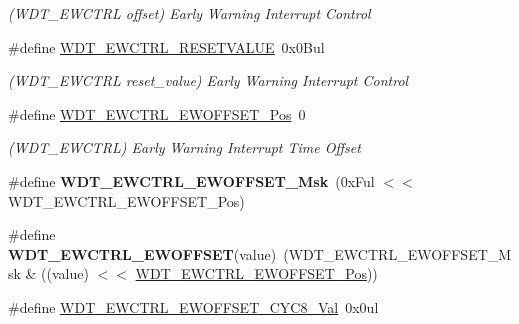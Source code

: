 \begin{DoxyCompactItemize}
\begin{DoxyCompactList}\small\item\em (W\+D\+T\+\_\+\+E\+W\+C\+T\+R\+L offset) Early Warning Interrupt Control \end{DoxyCompactList}\item 
\hypertarget{group___s_a_m_l21___w_d_t_ga9379b9c03732aac0dc5eacfe28fd35f8}{}\#define \hyperlink{group___s_a_m_l21___w_d_t_ga9379b9c03732aac0dc5eacfe28fd35f8}{W\+D\+T\+\_\+\+E\+W\+C\+T\+R\+L\+\_\+\+R\+E\+S\+E\+T\+V\+A\+L\+U\+E}~0x0\+Bul\label{group___s_a_m_l21___w_d_t_ga9379b9c03732aac0dc5eacfe28fd35f8}

\begin{DoxyCompactList}\small\item\em (W\+D\+T\+\_\+\+E\+W\+C\+T\+R\+L reset\+\_\+value) Early Warning Interrupt Control \end{DoxyCompactList}\item 
\hypertarget{group___s_a_m_l21___w_d_t_gabb7809711cdf296121c2108b55d3ad33}{}\#define \hyperlink{group___s_a_m_l21___w_d_t_gabb7809711cdf296121c2108b55d3ad33}{W\+D\+T\+\_\+\+E\+W\+C\+T\+R\+L\+\_\+\+E\+W\+O\+F\+F\+S\+E\+T\+\_\+\+Pos}~0\label{group___s_a_m_l21___w_d_t_gabb7809711cdf296121c2108b55d3ad33}

\begin{DoxyCompactList}\small\item\em (W\+D\+T\+\_\+\+E\+W\+C\+T\+R\+L) Early Warning Interrupt Time Offset \end{DoxyCompactList}\item 
\hypertarget{group___s_a_m_l21___w_d_t_ga9552ab7a09bdc45d499a65e49e3a446e}{}\#define {\bfseries W\+D\+T\+\_\+\+E\+W\+C\+T\+R\+L\+\_\+\+E\+W\+O\+F\+F\+S\+E\+T\+\_\+\+Msk}~(0x\+Ful $<$$<$ W\+D\+T\+\_\+\+E\+W\+C\+T\+R\+L\+\_\+\+E\+W\+O\+F\+F\+S\+E\+T\+\_\+\+Pos)\label{group___s_a_m_l21___w_d_t_ga9552ab7a09bdc45d499a65e49e3a446e}

\item 
\hypertarget{group___s_a_m_l21___w_d_t_gaa88d94af62577cb3a8ee526252da2818}{}\#define {\bfseries W\+D\+T\+\_\+\+E\+W\+C\+T\+R\+L\+\_\+\+E\+W\+O\+F\+F\+S\+E\+T}(value)~(W\+D\+T\+\_\+\+E\+W\+C\+T\+R\+L\+\_\+\+E\+W\+O\+F\+F\+S\+E\+T\+\_\+\+Msk \& ((value) $<$$<$ \hyperlink{group___s_a_m_l21___w_d_t_gabb7809711cdf296121c2108b55d3ad33}{W\+D\+T\+\_\+\+E\+W\+C\+T\+R\+L\+\_\+\+E\+W\+O\+F\+F\+S\+E\+T\+\_\+\+Pos}))\label{group___s_a_m_l21___w_d_t_gaa88d94af62577cb3a8ee526252da2818}

\item 
\hypertarget{group___s_a_m_l21___w_d_t_gacf599641c504019b8fd7c49bca7098fc}{}\#define \hyperlink{group___s_a_m_l21___w_d_t_gacf599641c504019b8fd7c49bca7098fc}{W\+D\+T\+\_\+\+E\+W\+C\+T\+R\+L\+\_\+\+E\+W\+O\+F\+F\+S\+E\+T\+\_\+\+C\+Y\+C8\+\_\+\+Val}~0x0ul\label{group___s_a_m_l21___w_d_t_gacf599641c504019b8fd7c49bca7098fc}


\end{DoxyCompactItemize}
